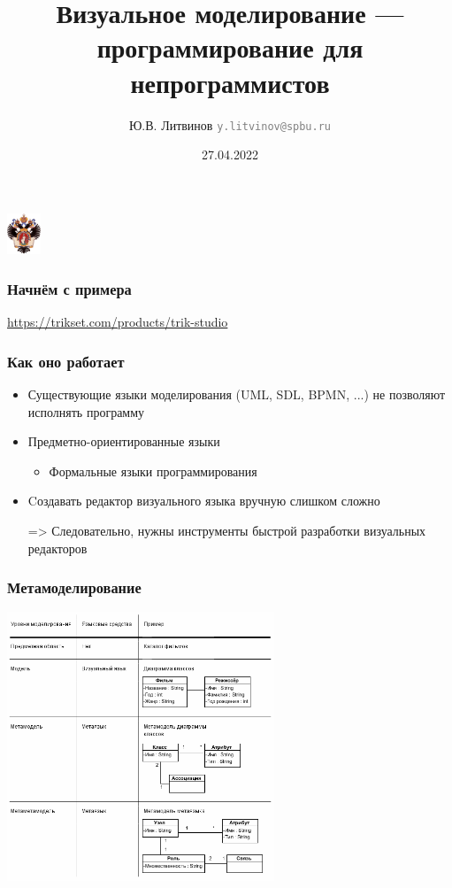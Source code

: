 \documentclass[xetex,mathserif,serif]{beamer}
\title[REAL.NET]{Визуальное моделирование --- программирование для непрограммистов}
\institute[CПбГУ]{Санкт-Петербургский государственный университет \\
    Кафедра системного программирования}
\author[Юрий Литвинов]{Ю.В. Литвинов \newline 
    \textcolor{gray}{\small\texttt{y.litvinov@spbu.ru}}
}
\date{27.04.2022}
\begin{document}
 

    \begin{frame}
        \begin{center} 
            {\includegraphics[width=1cm]{pictures/SPbGU_Logo.png}} 
        \end{center}
        \titlepage
    \end{frame}

    \begin{frame}
        \frametitle{Начнём с примера}
        \begin{center}
            \url{https://trikset.com/products/trik-studio}
        \end{center}
    \end{frame}

    \begin{frame}
        \frametitle{Как оно работает}
        \begin{itemize}
            \item Существующие языки моделирования (UML, SDL, BPMN, ...) не позволяют исполнять программу
            \item Предметно-ориентированные языки
            \begin{itemize}
                \item Формальные языки программирования
            \end{itemize}
            \item Cоздавать редактор визуального языка вручную слишком сложно
            \item[=>] Следовательно, нужны инструменты быстрой разработки визуальных редакторов
        \end{itemize}
    \end{frame}

    \begin{frame}
        \frametitle{Метамоделирование}
        \begin{center}
            \includegraphics[width=0.6\textwidth]{pictures/metalevels.png}
        \end{center}
    \end{frame}
\end{document}
